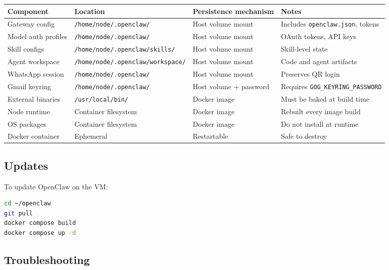 \begin{table}[h]
\centering
\small
\begin{tabular}{|l|l|l|l|}
\hline
Component & Location & Persistence mechanism & Notes \\
\hline
Gateway config & \texttt{/home/node/.openclaw/} & Host volume mount & Includes \texttt{openclaw.json}, tokens \\
\hline
Model auth profiles & \texttt{/home/node/.openclaw/} & Host volume mount & OAuth tokens, API keys \\
\hline
Skill configs & \texttt{/home/node/.openclaw/skills/} & Host volume mount & Skill-level state \\
\hline
Agent workspace & \texttt{/home/node/.openclaw/workspace/} & Host volume mount & Code and agent artifacts \\
\hline
WhatsApp session & \texttt{/home/node/.openclaw/} & Host volume mount & Preserves QR login \\
\hline
Gmail keyring & \texttt{/home/node/.openclaw/} & Host volume + password & Requires \texttt{GOG\_KEYRING\_PASSWORD} \\
\hline
External binaries & \texttt{/usr/local/bin/} & Docker image & Must be baked at build time \\
\hline
Node runtime & Container filesystem & Docker image & Rebuilt every image build \\
\hline
OS packages & Container filesystem & Docker image & Do not install at runtime \\
\hline
Docker container & Ephemeral & Restartable & Safe to destroy \\
\hline
\end{tabular}
\end{table}



\hrulefill


\subsection{Updates}


To update OpenClaw on the VM:

\begin{lstlisting}[language=bash]
cd ~/openclaw
git pull
docker compose build
docker compose up -d
\end{lstlisting}


\hrulefill


\subsection{Troubleshooting}


